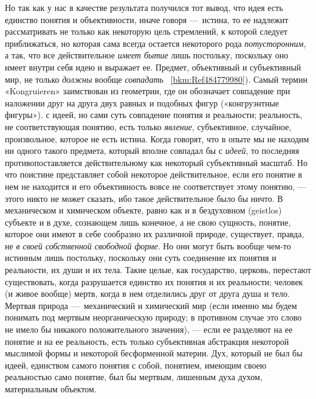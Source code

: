 \documentclass[twoside]{article}
\begin{document}
{{{{Но так как у нас в качестве результата получился тот вывод,
что идея есть единство понятия и объективности, иначе говоря
—~истина, то ее надлежит рассматривать не только как
некоторую цель стремлений, к которой следует приближаться, но которая сама
всегда остается некоторого рода
{\em потусторонним}, а
так, что все действительное {\em имеет
бытие} лишь постольку, поскольку оно имеет внутри себя идею
и выражает ее. Предмет, объективный и субъективный мир, не только
{\em должны} вообще
{\em совпадать}~ \ref{bkm:Ref484779980}).
Самый термин «Kongruieren» заимствован из геометрии, где он
обозначает совпадение при наложении друг на друга двух равных и подобных
фигур («конгруэнтные фигуры»).}\label{bkm:bm89}
с идеей, но сами суть совпадение понятия и реальности;
реальность, не соответствующая понятию, есть только
{\em явление},
субъективное, случайное, произвольное, которое не есть
истина. Когда говорят, что в опыте мы не находим ни одного такого предмета,
который вполне совпадал бы с
{\em идеей}, то последняя
противопоставляется действительному как некоторый
субъективный масштаб. Но что поистине представляет собой некоторое
действительное, если его понятие в нем не находится и его объективность
вовсе не соответствует этому понятию, — этого никто не может
сказать, ибо такое действительное было бы ничто. В механическом и
химическом объекте, равно как и в бездуховном (geistlos)
субъекте и в духе, сознающем лишь конечное, а не свою
сущность, понятие, которое они имеют в себе сообразно их различной природе,
существует, правда, не {\em в своей
собственной свободной форме}. Но они могут быть вообще
чем-то истинным лишь постольку, поскольку они суть соединение их понятия и
реальности, их души и их тела. Такие целые, как государство, церковь,
перестают существовать, когда разрушается единство их понятия и их
реальности; человек (и живое вообще) мертв, когда в нем отделились друг от
друга душа и тело. Мертвая природа —~механический и
химический мир (если именно мы будем понимать под мертвым неорганическую
природу; в противном случае это слово не имело бы никакого положительного
значения), — если ее разделяют на ее понятие и на ее
реальность, есть только субъективная абстракция некоторой мыслимой формы и
некоторой бесформенной материи. Дух, который не был бы идеей, единством
самого понятия с собой, понятием, имеющим своею реальностью само понятие,
был бы мертвым, лишенным духа духом, материальным объектом.

}}}
\end{document}
